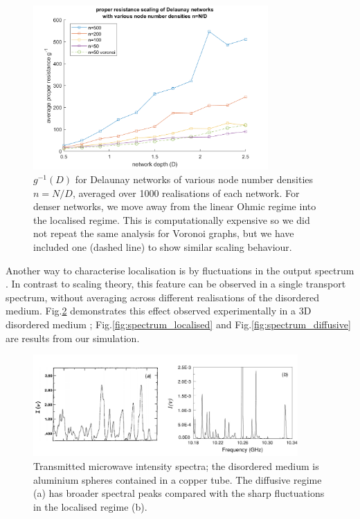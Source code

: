 \begin{figure}[h]
  \centering
    \includegraphics[width=0.8\textwidth]{ch3/fig3/delaunay_scaling.png}
    \caption{$g^{-1}(D)$ for Delaunay networks of various node number densities $n=N/D$, averaged over 1000 realisations of each network. For denser networks, we move away from the linear Ohmic regime into the localised regime. This is computationally expensive so we did not repeat the same analysis for Voronoi graphs, but we have included one (dashed line) to show similar scaling behaviour.} 
    \label{fig:delaunay_scaling}
\end{figure}

Another way to characterise localisation is by fluctuations in the output spectrum \cite{Muller2011}. In contrast to scaling theory, this feature can be observed in a single transport spectrum, without averaging across different realisations of the disordered medium. Fig.\ref{fig:spectrum_microwave} demonstrates this effect observed experimentally in a 3D disordered medium \cite{Genack2005}; Fig.\ref{fig:spectrum_localised} and Fig.\ref{fig:spectrum_diffusive} are results from our simulation.

\begin{figure}[htp]
  \centering
    \includegraphics[width=0.9\textwidth]{ch3/fig3/spectrum_microwave.jpg}
    \caption{Transmitted microwave intensity spectra; the disordered medium is aluminium spheres contained in a copper tube. The diffusive regime (a) has broader spectral peaks compared with the sharp fluctuations in the localised regime (b). \cite{Genack2005}} 
    \label{fig:spectrum_microwave}
\end{figure}


